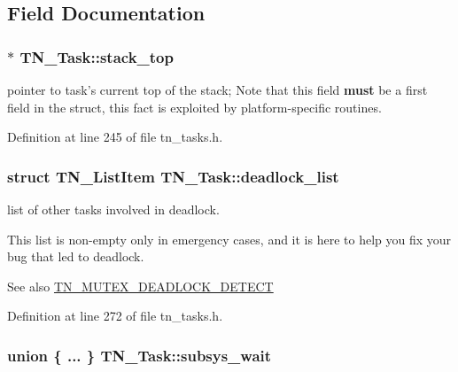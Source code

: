 \subsection{Field Documentation}
\hypertarget{structTN__Task_a6e31948663b2846ac9dddc05f529286a}{
\subsubsection[{stack\+\_\+top}]{$\ast$ T\+N\+\_\+\+Task\+::stack\+\_\+top}}\label{structTN__Task_a6e31948663b2846ac9dddc05f529286a}


pointer to task's current top of the stack; Note that this field {\bfseries must} be a first field in the struct, this fact is exploited by platform-\/specific routines. 



Definition at line 245 of file tn\+\_\+tasks.\+h.

\hypertarget{structTN__Task_a097e79851e01fb3c73f0346d99ea8b7e}{
\subsubsection[{deadlock\+\_\+list}]{\setlength{\rightskip}{0pt plus 5cm}struct {\bf T\+N\+\_\+\+List\+Item} T\+N\+\_\+\+Task\+::deadlock\+\_\+list}}\label{structTN__Task_a097e79851e01fb3c73f0346d99ea8b7e}


list of other tasks involved in deadlock. 

This list is non-\/empty only in emergency cases, and it is here to help you fix your bug that led to deadlock.

\begin{DoxySeeAlso}{See also}
{\ttfamily \hyperlink{tn__cfg__default_8h_a6ed3ec7b0d4338e7f60dde86b7ea5fa4}{T\+N\+\_\+\+M\+U\+T\+E\+X\+\_\+\+D\+E\+A\+D\+L\+O\+C\+K\+\_\+\+D\+E\+T\+E\+C\+T}} 
\end{DoxySeeAlso}


Definition at line 272 of file tn\+\_\+tasks.\+h.

\hypertarget{structTN__Task_a7b1e431e2e2c65d8de74d48b44cf68ee}{
\subsubsection[{subsys\+\_\+wait}]{\setlength{\rightskip}{0pt plus 5cm}union \{ ... \}   T\+N\+\_\+\+Task\+::subsys\+\_\+wait}}\label{structTN__Task_a7b1e431e2e2c65d8de74d48b44cf68ee}


